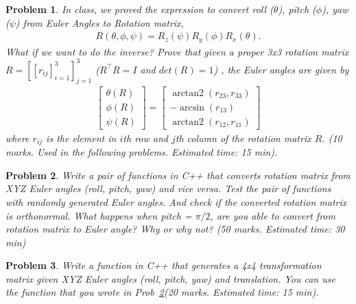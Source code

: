 \documentclass[twocolumn]{article}
\newtheorem{prob}{Problem}
\DeclareMathOperator{\arctantwo}{arctan2}
\begin{document}
\begin{prob}
  In class, we proved the expression to convert roll ($\theta$), pitch
  ($\phi$), yaw ($\psi$) from Euler Angles to Rotation matrix,
  \begin{align}
    R(\theta, \phi, \psi) = R_z(\psi) R_y(\phi) R_x(\theta).
  \end{align}
  What if we want to do the inverse? Prove that given a proper 3x3 rotation
  matrix $R = [[r_{ij}]_{i=1}^3]_{j=1}^3$ ($R^\top R = I$ and $det(R) = 1$) , the Euler angles are given by
  \begin{align}
    \begin{bmatrix}
    \theta(R) \\
    \phi(R) \\
    \psi(R)
    \end{bmatrix}
    = \begin{bmatrix}
      \arctantwo(r_{23}, r_{33}) \\
      -\arcsin(r_{13}) \\
      \arctantwo(r_{12}, r_{11})
      \end{bmatrix}
  \end{align}
  where $r_{ij}$ is the element in $i$th row and $j$th column of the rotation
  matrix $R$. (10 marks. Used in the
  following problems. Estimated time: 15 min).
\end{prob}

\begin{prob}
  Write a pair of functions in C++ that converts rotation matrix from XYZ Euler
angles (roll, pitch, yaw) and vice versa. Test the pair of functions with
randomly generated Euler angles. And check if the converted rotation matrix is
orthonormal. What happens when pitch = $\pi/2$, are you able to convert from
rotation matrix to Euler angle? Why or why not? (50 marks. Estimated time: 30 min)
\label{prob:euler-to-rotmat}
\end{prob}

\begin{prob}
  Write a function in C++ that generates a 4x4 transformation matrix given XYZ Euler
  angles (roll, pitch, yaw) and translation. You can use the function that you
  wrote in Prob~\ref{prob:euler-to-rotmat}(20 marks. Estimated time: 15 min).
\end{prob}



%
%
\end{document}
